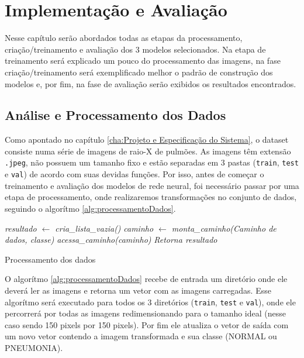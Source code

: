 \chapter{Implementação e Avaliação}
\label{cha:Implementação e Avaliação}


Nesse capítulo serão abordados todas as etapas da processamento, criação/treinamento e avaliação dos 3 modelos selecionados. Na etapa de treinamento será explicado um pouco do processamento das imagens, na fase criação/treinamento será exemplificado melhor o padrão de construção dos modelos e, por fim, na fase de avaliação serão exibidos os resultados encontrados.

\section{Análise e Processamento dos Dados}

Como apontado no capítulo \ref{cha:Projeto e Especificação do Sistema}, o dataset consiste numa série de imagens de raio-X de pulmões. As imagens têm extensão \verb|.jpeg|, não possuem um tamanho fixo e estão separadas em 3 pastas (\verb|train|, \verb|test| e \verb|val|) de acordo com suas devidas funções. Por isso, antes de começar o treinamento e avaliação dos modelos de rede neural, foi necessário passar por uma etapa de processamento, onde realizaremos transformações no conjunto de dados, seguindo o algorítmo \ref{alg:processamentoDados}.

\begin{algorithm}
    \DontPrintSemicolon
    \BlankLine
    \emph{resultado $\xleftarrow{}$ cria\_lista\_vazia()}\;
     {
        \emph{caminho $\xleftarrow{}$ monta\_caminho(Caminho de dados, classe)}\;
        \emph{acessa\_caminho(caminho)}\;
    }
    \emph{Retorna resultado}\;
    
    \caption{Processamento dos dados}
    \label{alg:processamentoDados}
\end{algorithm}\DecMargin{1em}

O algorítmo \ref{alg:processamentoDados} recebe de entrada um diretório onde ele deverá ler as imagens e retorna um vetor com as imagens carregadas. Esse algorítmo será executado para todos os 3 diretórios (\verb|train|, \verb|test| e \verb|val|), onde ele percorrerá por todas as imagens redimensionando para o tamanho ideal (nesse caso sendo 150 pixels por 150 pixels). Por fim ele atualiza o vetor de saída com um novo vetor contendo a imagem transformada e sua classe (NORMAL ou PNEUMONIA).

